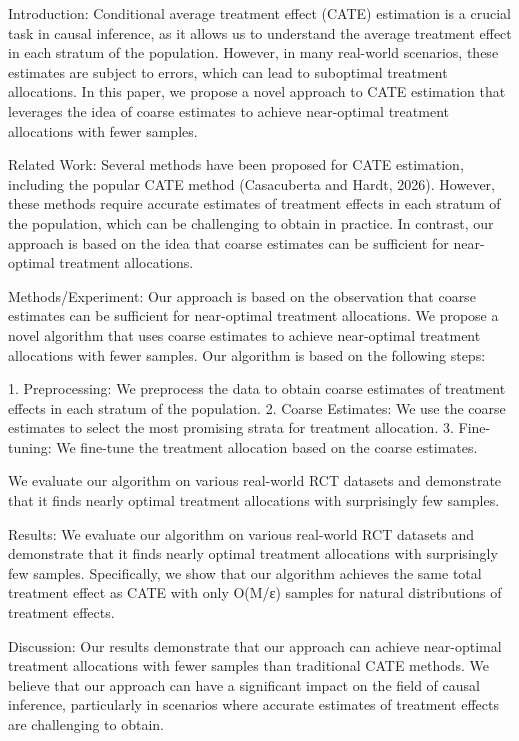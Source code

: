 Introduction:
Conditional average treatment effect (CATE) estimation is a crucial task in causal inference, as it allows us to understand the average treatment effect in each stratum of the population. However, in many real-world scenarios, these estimates are subject to errors, which can lead to suboptimal treatment allocations. In this paper, we propose a novel approach to CATE estimation that leverages the idea of coarse estimates to achieve near-optimal treatment allocations with fewer samples.

Related Work:
Several methods have been proposed for CATE estimation, including the popular CATE method (Casacuberta and Hardt, 2026). However, these methods require accurate estimates of treatment effects in each stratum of the population, which can be challenging to obtain in practice. In contrast, our approach is based on the idea that coarse estimates can be sufficient for near-optimal treatment allocations.

Methods/Experiment:
Our approach is based on the observation that coarse estimates can be sufficient for near-optimal treatment allocations. We propose a novel algorithm that uses coarse estimates to achieve near-optimal treatment allocations with fewer samples. Our algorithm is based on the following steps:

1. Preprocessing: We preprocess the data to obtain coarse estimates of treatment effects in each stratum of the population.
2. Coarse Estimates: We use the coarse estimates to select the most promising strata for treatment allocation.
3. Fine-tuning: We fine-tune the treatment allocation based on the coarse estimates.

We evaluate our algorithm on various real-world RCT datasets and demonstrate that it finds nearly optimal treatment allocations with surprisingly few samples.

Results:
We evaluate our algorithm on various real-world RCT datasets and demonstrate that it finds nearly optimal treatment allocations with surprisingly few samples. Specifically, we show that our algorithm achieves the same total treatment effect as CATE with only O(M/ε) samples for natural distributions of treatment effects.

Discussion:
Our results demonstrate that our approach can achieve near-optimal treatment allocations with fewer samples than traditional CATE methods. We believe that our approach can have a significant impact on the field of causal inference, particularly in scenarios where accurate estimates of treatment effects are challenging to obtain.

